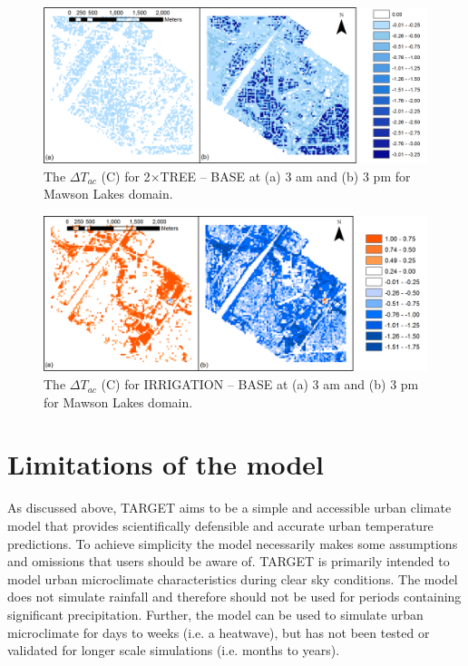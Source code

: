 \documentclass[gmd, manuscript]{copernicus}
\begin{document}
\begin{figure}[!htbp]
\includegraphics[width=1.0\textwidth,keepaspectratio]{figure9.png}
 \caption{The $\Delta T_{ac}$ (\degree C) for 2$\times$TREE -- BASE at (a) 3 am and (b) 3 pm for Mawson Lakes domain.} \label{fig:tree_scen}


\end{figure}

\begin{figure}[!htbp]

\includegraphics[width=1.0\textwidth,keepaspectratio]{figure10.png}

 \caption{The $\Delta T_{ac}$ (\degree C) for IRRIGATION -- BASE  at (a) 3 am and (b) 3 pm for Mawson Lakes domain.} \label{fig:irr_scen}


\end{figure}



\section{Limitations of the model}



As discussed above, TARGET aims to be a simple and accessible urban climate model that provides scientifically defensible and accurate urban temperature predictions. To achieve simplicity the model necessarily makes some  assumptions and omissions that users should be aware of.   TARGET is primarily intended to model urban microclimate characteristics during clear sky conditions. The model does not simulate rainfall and therefore should not be used for periods containing significant precipitation. Further, the model can be used to simulate urban microclimate for days to weeks (i.e. a heatwave), but has not been tested or validated for longer scale simulations (i.e. months to years). 
\end{document}
